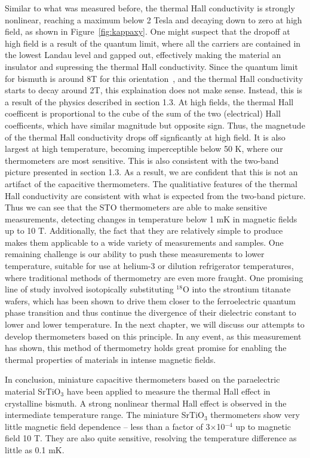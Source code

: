 \documentclass{thesis-umich}
\begin{document}
Similar to what was measured before\cite{Kobayashi2012}, the thermal Hall
conductivity is strongly nonlinear, reaching a maximum below 2 Tesla and
decaying down to zero at high field, as shown in Figure~\ref{fig:kappaxy}. One might suspect that the dropoff at high field is a result of the quantum limit, where all the carriers are contained in the lowest Landau level and gapped out, effectively making the material an insulator and supressing the thermal Hall conductivity. Since the quantum limit for bismuth is around 8T for this orientation~\cite{Li2008}, and the thermal Hall conductivity starts to decay around 2T, this explaination does not make sense. Instead, this is a result of the physics described in section 1.3. At high fields, the thermal Hall coefficent is proportional to the cube of the sum of the two (electrical) Hall coefficents, which have similar magnitude but opposite sign. Thus, the magnetude of the thermal Hall conductivity drops off signficantly at high field.
It is also largest at high temperature, becoming imperceptible below 50 K, where our
thermometers are most sensitive. This is also consistent with the two-band picture presented in section 1.3. As a result, we are confident that this is not
an artifact of the capacitive thermometers. The qualitiative features of the thermal Hall conductivity are consistent with what is expected from the two-band picture. Thus we can see that the STO
thermometers are able to make sensitive measurements, detecting changes in
temperature below 1 mK in magnetic fields up to 10 T. Additionally, the fact
that they are relatively simple to produce makes them applicable to a wide
variety of measurements and samples. One remaining challenge is our ability to
push these measurements to lower temperature, suitable for use at helium-3 or
dilution refrigerator temperatures, where traditional methods of thermometry are
even more fraught\cite{Heine1998, Goodrich1998}. One promising line of study
involved isotopically substituting $^{18}$O into the strontium titanate wafers,
which has been shown\cite{Rowley2014} to drive them closer to the ferroelectric
quantum phase transition and thus continue the divergence of their dielectric
constant to lower and lower temperature. In the next chapter, we will discuss our attempts to develop thermometers based on this principle. In any event, as this measurement has
shown, this method of thermometry holds great promise for enabling the thermal
properties of materials in intense magnetic fields.

In conclusion, miniature capacitive thermometers based on the paraelectric
material SrTiO$_3$ have been applied to measure the thermal Hall effect in
crystalline bismuth. A strong nonlinear thermal Hall effect is observed in the
intermediate temperature range. The miniature SrTiO$_3$ thermometers show very
little magnetic field dependence -- less than a factor of 3$\times$10$^{-4}$ up
to magnetic field 10 T. They are also quite sensitive, resolving the temperature
difference as little as 0.1 mK.
\end{document}
